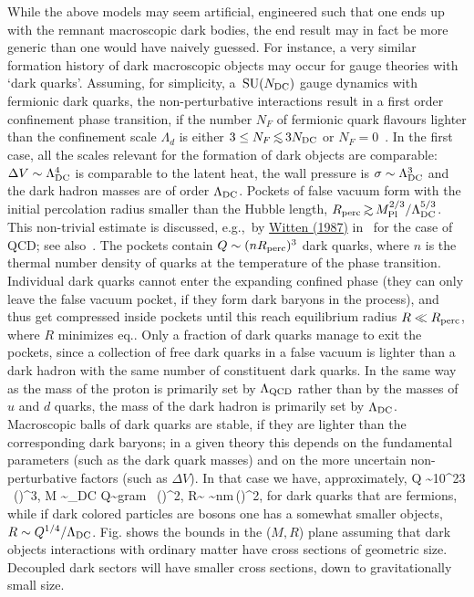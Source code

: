 \smallskip

While the above models may seem artificial, engineered such that one ends up with the remnant macroscopic dark bodies, 
the end result may in fact be more generic than one would have naively guessed. 
For instance, a very similar formation history of dark macroscopic objects may occur for
gauge theories with `dark quarks'. 
Assuming, for simplicity, a $\,{\rm SU}(N_{\rm DC})$ gauge dynamics with fermionic dark quarks,
the non-perturbative interactions result in a first order confinement phase transition, 
if the number $N_F$  of fermionic quark flavours lighter than the confinement scale $\Lambda_d$ is either
$3\le N_F \circa{<}3N_{\rm DC}$ or $N_F=0$~\cite{QballsBis}.
In the first case, all the scales relevant for the formation of dark objects are comparable:
$\Delta V \sim\Lambda_{\rm DC}^4$ is comparable to the latent heat, 
the wall pressure is $\sigma\sim\Lambda_{\rm DC}^3$
and the dark hadron masses are of order $\Lambda_{\rm DC}$.
Pockets of false vacuum form with the initial percolation radius smaller than the Hubble length,
$R_{\rm perc}\circa{>} M_{\rm Pl}^{2/3}/\Lambda_{\rm DC}^{5/3}$.
This non-trivial estimate is discussed, e.g.,\ by \href{https://doi.org/10.1103/PhysRevD.30.272}{Witten (1987)} in~\cite{quark:matter:DM} for the case of QCD; see also~\cite{QballsBis}. 
The pockets contain $Q \sim (n R_{\rm perc})^3$ dark quarks, where $n$ is the thermal number density of quarks at the temperature of the phase transition.
Individual dark quarks cannot enter the expanding confined phase (they can only leave the false vacuum pocket, if they form dark baryons in the process), and thus 
get compressed inside pockets until this reach equilibrium radius $R \ll R_{\rm perc}$, where $R$ minimizes eq.. 
Only a fraction of dark quarks manage to exit the pockets, 
since a collection of free dark quarks in a false vacuum is lighter than a dark hadron with the same number of constituent dark quarks.
In the same way as the mass of the proton is primarily set by $\Lambda_{\rm QCD}$ rather than by the masses of $u$ and $d$ quarks, 
the mass of the dark hadron is primarily set by $\Lambda_{\rm DC}$.
Macroscopic balls of dark quarks are stable, if they are lighter than the corresponding dark baryons;
in a given theory this depends on the fundamental parameters (such as the dark quark masses) and on the more uncertain 
non-perturbative factors (such as $\Delta V$).
In that case we have, approximately, 
\beq 
Q \sim 10^{23} \, \left(\right)^3,\qquad
M \sim \Lambda_{\rm DC} Q\sim {\rm gram} \, \left(\right)^2,\qquad 
R\sim {} \sim {\rm nm}\,\left(\right)^2,
\eeq
for dark quarks that are fermions, while if dark colored particles are bosons one has a somewhat smaller objects, $R\sim Q^{1/4}/\Lambda_{\rm DC}$.
Fig. shows the bounds in the  ($M,R$) plane
assuming that dark objects interactions with ordinary matter have cross sections of geometric size. 
Decoupled dark sectors will have smaller cross sections, down to gravitationally small size.

